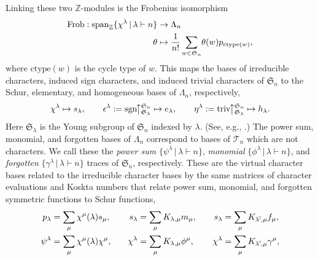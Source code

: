 \documentclass[12pt]{amsart}
\numberwithin{equation}{section}
\newcommand{\sn}{\mathfrak{S}_n}
\newcommand{\defeq}{:=}
\newcommand{\spn}{\mathrm{span}}
\newcommand{\sgn}{\mathrm{sgn}}
\newcommand{\triv}{\mathrm{triv}}
\newcommand{\tr}{{\negthickspace \top \negthickspace}}
\newcommand{\ntnsp}{\negthinspace}
\newcommand{\nTksp}{\negthickspace\negthickspace}
\newcommand{\ctype}{\mathrm{ctype}}
\newcommand{\slambda}{\mathfrak{S}_\lambda}
\newcommand{\trspace}[1]{\mathcal{T}_{#1}}
\newcommand{\upparrow}{\big \uparrow \nTksp \phantom{\uparrow}}
\begin{document}
Linking these two $\mathbb Z$-modules is the Frobenius isomorphism
\begin{equation}\label{eq:Frob}
  \begin{aligned}
  \mathrm{Frob}: \spn_{\mathbb Z}\{ \chi^\lambda \,|\, \lambda \vdash n \}
  &\rightarrow \Lambda_n\\
  \theta &\mapsto \frac 1{n!} \sum_{w \in \sn} \ntnsp \theta(w) p_{\ctype(w)},
  \end{aligned}
\end{equation}
where $\ctype(w)$ is the cycle type of $w$.
This maps the bases of
irreducible characters,
induced sign characters,
and induced trivial characters of $\sn$
to the Schur, elementary, and homogeneous bases of $\Lambda_n$, respectively,
\begin{equation*}
  \chi^\lambda \mapsto s_\lambda,
  \qquad
  \epsilon^\lambda \defeq \sgn \ntnsp \upparrow_{\slambda}^{\sn} \mapsto e_\lambda,
  \qquad
  \eta^\lambda \defeq \triv \ntnsp \upparrow_{\slambda}^{\sn} \mapsto h_\lambda.  
\end{equation*}
Here $\slambda$ is the Young subgroup of $\sn$
indexed by $\lambda$.  (See, e.g., \cite{Sag}.)
The power sum,
monomial,
and forgotten bases of $\Lambda_n$ correspond
to
bases of $\trspace n$
which are not characters.
We call these the
{\em power sum}
$\{\psi^\lambda \,|\, \lambda \vdash n \}$,
{\em monomial}
$\{ \phi^\lambda \,|\, \lambda \vdash n \}$,
and {\em forgotten}
$\{ \gamma^\lambda \,|\, \lambda \vdash n \}$
traces of $\sn$, respectively.
These
are
the virtual character bases related to the irreducible character bases
by the same matrices of character evaluations and
Koskta numbers that relate
power sum, monomial, and forgotten symmetric functions to Schur functions,
\begin{equation}\label{eq:mforgotten}
  \begin{alignedat}{3}
    p_\lambda &= \sum_\mu \chi^\mu(\lambda) s_\mu, &\qquad
    s_\lambda &= \sum_\mu K_{\lambda,\mu} m_\mu, &\qquad
    s_\lambda &= \sum_\mu K_{\lambda^\tr,\mu} f_\mu,\\
    \psi^\lambda &= \sum_\mu \chi^\mu(\lambda) \chi^\mu, &\qquad
    \chi^\lambda &= \sum_\mu K_{\lambda,\mu} \phi^\mu, &\qquad
    \chi^\lambda &= \sum_\mu K_{\lambda^\tr,\mu} \gamma^\mu,
  \end{alignedat}
\end{equation}
\end{document}
